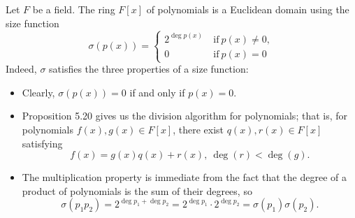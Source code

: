 \documentclass[math1530-lecture-notes]{subfiles}
\begin{document}
Let $F$ be a field. The ring $F[x]$ of polynomials is a Euclidean domain using the size function \[
  \sigma(p(x))=\left\{\begin{array}{lr}2^{\deg{p(x)}} & ~\text{if}~p(x)\neq 0,\\
    0&~\text{if}~p(x)=0\end{array}\right.
\] Indeed, $\sigma$ satisfies the three properties of a size function:
\begin{itemize}
  \item Clearly, $\sigma(p(x))=0$ if and only if $p(x)=0$.
  \item Proposition 5.20 gives us the division algorithm for polynomials; that is, for polynomials
    $f(x),g(x)\in F[x]$, there exist $q(x),r(x)\in F[x]$ satisfying \[
      f(x)=g(x)q(x)+r(x),\ \deg{(r)}<\deg{(g)}
    .\]
  \item The multiplication property is immediate from the fact that the degree of a product of
    polynomials is the sum of their degrees, so \[
      \sigma(p_1p_2)=2^{\deg{p_1}+\deg{p_2}}=2^{\deg{p_1}}\cdot 2^{\deg{p_2}}=\sigma(p_1)\sigma(p_2)
    .\] 
\end{itemize}
\end{document}
